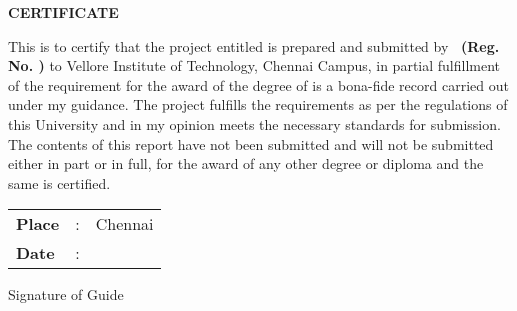 \thispagestyle{plain}
\begin{center}
{\Large \bf CERTIFICATE}
\end{center}

%
%
This is to certify that the project entitled {\bf \printtitle} is prepared and 
submitted by {\bf \thestudent\  
(Reg. No. \theregno)}
to Vellore Institute of Technology, Chennai Campus, in partial fulfillment of the requirement for the award of
the degree of {\bf \theprogramme} 
is a bona-fide record carried out under my guidance.
The project fulfills the requirements as per the regulations of this
University and in my opinion meets the necessary standards for submission.
The contents of this report have not been submitted and will not be submitted
either in part or in full, for the award of any other degree or diploma
and the same is certified.
%
%

\vspace{3\baselineskip}

\begin{minipage}{.5\textwidth}
	\raggedright
	\begin{tabular}{lcl}
		\textbf{Place}  & : & Chennai \\
		\textbf{Date} & : &
	\end{tabular}
\end{minipage}%
\begin{minipage}{.5\textwidth}
	\raggedleft
	Signature of Guide\\
	{\bf \theguide}\\
\end{minipage}

\raggedbottom
\cleardoublepage
%
%  
